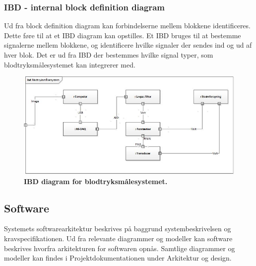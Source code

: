 \subsubsection{IBD - internal block definition diagram}
Ud fra block definition diagram kan forbindelserne mellem blokkene identificeres. Dette føre til at et IBD diagram kan opstilles. Et IBD bruges til at bestemme signalerne mellem blokkene, og identificere hvilke signaler der sendes ind og ud af hver blok. Det er ud fra IBD der bestemmes hvilke signal typer, som blodtryksmålesystemet kan integrerer med.
\begin{figure}[H]
\includegraphics[width =1.0\textwidth , center]{billeder/IBD}
\caption{\textbf{IBD diagram for blodtryksmålesystemet.}}
\end{figure}
\subsection{Software}
Systemets softwarearkitektur beskrives på baggrund systembeskrivelsen og kravspecifikationen. Ud fra relevante diagrammer og modeller kan software beskrives hvorfra arkitekturen for softwaren opnås. Samtlige diagrammer og modeller kan findes i Projektdokumentationen under Arkitektur og design.
